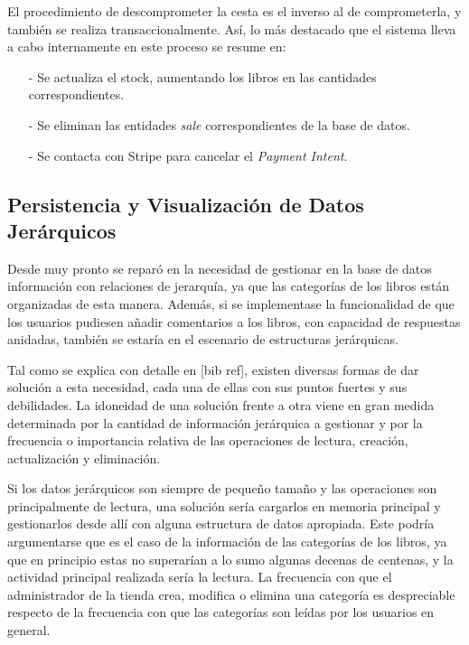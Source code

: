 \documentclass[a4paper]{article}
\begin{document}
    El procedimiento de descomprometer la cesta es el inverso al de comprometerla, y también se realiza transaccionalmente. Así, lo más destacado que el sistema lleva a cabo internamente en este proceso se resume en:
    
    \begin{itemize}
    	\item[-] Se actualiza el stock, aumentando los libros en las cantidades correspondientes.
    	\item[-] Se eliminan las entidades \emph{sale} correspondientes de la base de datos.
    	\item[-] Se contacta con Stripe para cancelar el \emph{Payment Intent}.
    \end{itemize}

    \subsection{Persistencia y Visualización de Datos Jerárquicos} \label{sec:hierarchy}
    Desde muy pronto se reparó en la necesidad de gestionar en la base de datos información con relaciones de jerarquía, ya que las categorías de los libros están organizadas de esta manera. Además, si se implementase la funcionalidad de que los usuarios pudiesen añadir comentarios a los libros, con capacidad de respuestas anidadas, también se estaría en el escenario de estructuras jerárquicas.
    
    Tal como se explica con detalle en [bib ref], existen diversas formas de dar solución a esta necesidad, cada una de ellas con sus puntos fuertes y sus debilidades. La idoneidad de una solución frente a otra viene en gran medida determinada por la cantidad de información jerárquica a gestionar y por la frecuencia o importancia relativa de las operaciones de lectura, creación, actualización y eliminación.
    
    Si los datos jerárquicos son siempre de pequeño tamaño y las operaciones son principalmente de lectura, una solución sería cargarlos en memoria principal y gestionarlos desde allí con alguna estructura de datos apropiada. Este podría argumentarse que es el caso de la información de las categorías de los libros, ya que en principio estas no superarían a lo sumo algunas decenas de centenas, y la actividad principal realizada sería la lectura. La frecuencia con que el administrador de la tienda crea, modifica o elimina una categoría es despreciable respecto de la frecuencia con que las categorías son leídas por los usuarios en general.
    
\end{document}
